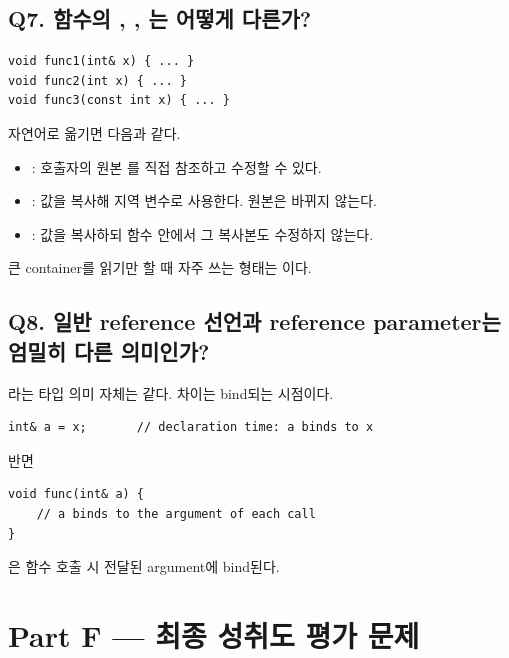 \subsection{Q7. 함수의 , , 는 어떻게 다른가?}
\begin{lstlisting}
void func1(int& x) { ... }
void func2(int x) { ... }
void func3(const int x) { ... }
\end{lstlisting}

자연어로 옮기면 다음과 같다.
\begin{itemize}
  \item {}: 호출자의 원본 를 직접 참조하고 수정할 수 있다.
  \item {}: 값을 복사해 지역 변수로 사용한다. 원본은 바뀌지 않는다.
  \item {}: 값을 복사하되 함수 안에서 그 복사본도 수정하지 않는다.
\end{itemize}

큰 container를 읽기만 할 때 자주 쓰는 형태는 이다.

\subsection{Q8. 일반 reference 선언과 reference parameter는 엄밀히 다른 의미인가?}
라는 타입 의미 자체는 같다. 차이는 bind되는 시점이다.
\begin{lstlisting}
int& a = x;       // declaration time: a binds to x
\end{lstlisting}

반면
\begin{lstlisting}
void func(int& a) {
    // a binds to the argument of each call
}
\end{lstlisting}
은 함수 호출 시 전달된 argument에 bind된다.

\section{Part F --- 최종 성취도 평가 문제}

